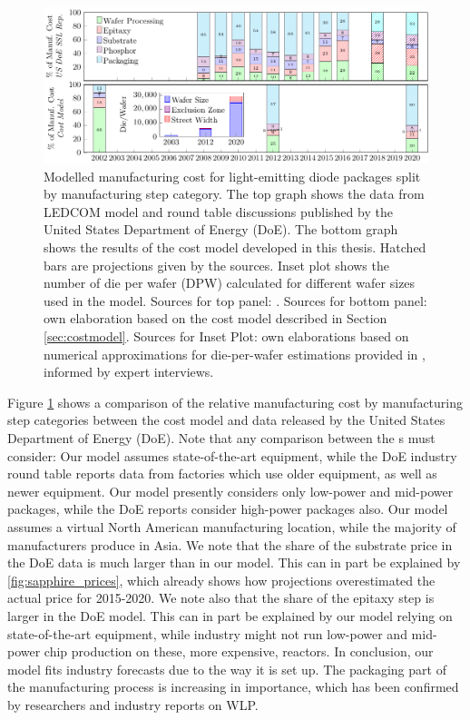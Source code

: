 \documentclass[10pt]{article}
\begin{document}
\begin{figure}[h]
	\centering
    \includegraphics[width=\textwidth]{2_SSL_EES/article/figures/costmodel_calibration.pdf}
	\caption{Modelled manufacturing cost for light-emitting diode packages split by manufacturing step category. The top graph shows the data from LEDCOM model and round table discussions published by the United States Department of Energy (DoE). The bottom graph shows the results of the cost model developed in this thesis. Hatched bars are projections given by the sources. Inset plot shows the number of die per wafer (DPW) calculated for different wafer sizes used in the model. Sources for top panel: \cite{doe2010solid}\cite{doe2011solid}\cite{doe2012solid}\cite{doe2013solid}\cite{doe2014solid}\cite{doe2015solid}\cite{doe2016solid}. Sources for bottom panel: own elaboration based on the cost model described in Section \cref{sec:costmodel}. Sources for Inset Plot: own elaborations based on numerical approximations for die-per-wafer estimations provided in \cite{de2005investigation}, informed by expert interviews.}
	\label{fig:costmodel_calibration}
\end{figure}

Figure \cref{fig:costmodel_calibration} shows a comparison of the relative manufacturing cost by manufacturing step categories between the cost model and data released by the United States Department of Energy (DoE). Note that any comparison between the s must consider: Our model assumes state-of-the-art equipment, while the DoE industry round table reports data from factories which use older equipment, as well as newer equipment. Our model presently considers only low-power and mid-power packages, while the DoE reports consider high-power packages also. Our model assumes a virtual North American manufacturing location, while the majority of manufacturers produce in Asia. We note that the share of the substrate price in the DoE data is much larger than in our model. This can in part be explained by  \cref{fig:sapphire_prices}, which already shows how projections overestimated the actual price for 2015-2020. We note also that the share of the epitaxy step is larger in the DoE model. This can in part be explained by our model relying on state-of-the-art equipment, while industry might not run low-power and mid-power chip production on these, more expensive, reactors. In conclusion, our model fits industry forecasts due to the way it is set up. The packaging part of the manufacturing process is increasing in importance, which has been confirmed by researchers and industry reports on WLP\cite{Lee2011WPL}\cite{Xie2013}\cite{ledsmag2017WLP}.
\end{document}
